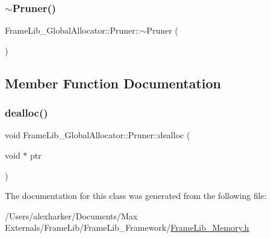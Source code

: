 \mbox{\label{class_frame_lib___global_allocator_1_1_pruner_af1b947e70e93d005e5a996ea2010e51a}} 
\subsubsection{\texorpdfstring{$\sim$\+Pruner()}{~Pruner()}}
{\footnotesize\ttfamily Frame\+Lib\+\_\+\+Global\+Allocator\+::\+Pruner\+::$\sim$\+Pruner (\begin{DoxyParamCaption}{ }\end{DoxyParamCaption})\hspace{0.3cm}{\ttfamily [inline]}}



\subsection{Member Function Documentation}
\mbox{\label{class_frame_lib___global_allocator_1_1_pruner_ad261c2fb12e19ce40ed3af4c550c479c}} 
\subsubsection{\texorpdfstring{dealloc()}{dealloc()}}
{\footnotesize\ttfamily void Frame\+Lib\+\_\+\+Global\+Allocator\+::\+Pruner\+::dealloc (\begin{DoxyParamCaption}\item[{void $\ast$}]{ptr }\end{DoxyParamCaption})\hspace{0.3cm}{\ttfamily [inline]}}



The documentation for this class was generated from the following file\+:\begin{DoxyCompactItemize}
\item 
/\+Users/alexharker/\+Documents/\+Max Externals/\+Frame\+Lib/\+Frame\+Lib\+\_\+\+Framework/\hyperlink{_frame_lib___memory_8h}{Frame\+Lib\+\_\+\+Memory.\+h}\end{DoxyCompactItemize}

